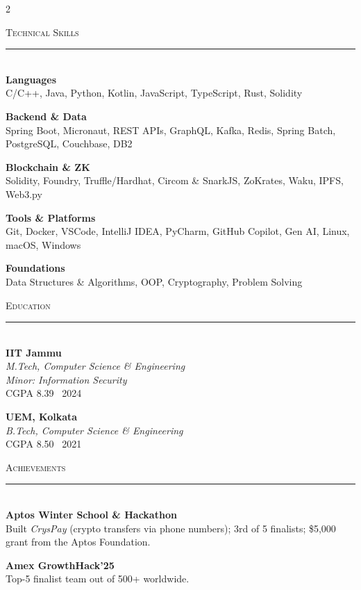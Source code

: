 \documentclass[letterpaper,10pt]{article}
\newcommand{\sideheading}[1]{%
  {\vspace{2pt}\scshape\large\color{accent}#1}\\[-4pt]
  {\color{accent}\rule{\linewidth}{0.6pt}}\\[-2pt]
}
\begin{document}
\begin{paracol}{2}

\small
\vspace*{12pt}

\sideheading{Technical Skills}
\textbf{Languages}\\
C/C++, Java, Python, Kotlin, JavaScript, TypeScript, Rust, Solidity
\vspace{4pt}

\textbf{Backend \& Data}\\
Spring Boot, Micronaut, REST APIs, GraphQL, Kafka, Redis, Spring Batch, PostgreSQL, Couchbase, DB2
\vspace{4pt}

\textbf{Blockchain \& ZK}\\
Solidity, Foundry, Truffle/Hardhat, Circom \& SnarkJS, ZoKrates, Waku, IPFS, Web3.py
\vspace{4pt}

\textbf{Tools \& Platforms}\\
Git, Docker, VSCode, IntelliJ IDEA, PyCharm, GitHub Copilot, Gen AI, Linux, macOS, Windows
\vspace{4pt}

\textbf{Foundations}\\
Data Structures \& Algorithms, OOP, Cryptography, Problem Solving
\vspace{8pt}

\sideheading{Education}
\textbf{IIT Jammu}\\
\textit{\small M.Tech, Computer Science \& Engineering}\\
\textit{\small Minor: Information Security}\\
{\small CGPA 8.39 \textbullet\ 2024}
\vspace{6pt}

\textbf{UEM, Kolkata}\\
\textit{\small B.Tech, Computer Science \& Engineering}\\
{\small CGPA 8.50 \textbullet\ 2021}
\vspace{8pt}

\sideheading{Achievements}
\textbf{Aptos Winter School \& Hackathon}\\
Built \emph{CrysPay} (crypto transfers via phone numbers); 3rd of 5 finalists; \$5,000 grant from the Aptos Foundation.
\vspace{4pt}

\textbf{Amex GrowthHack'25}\\
Top-5 finalist team out of 500+ worldwide.
\vspace{4pt}


\end{paracol}
\end{document}
